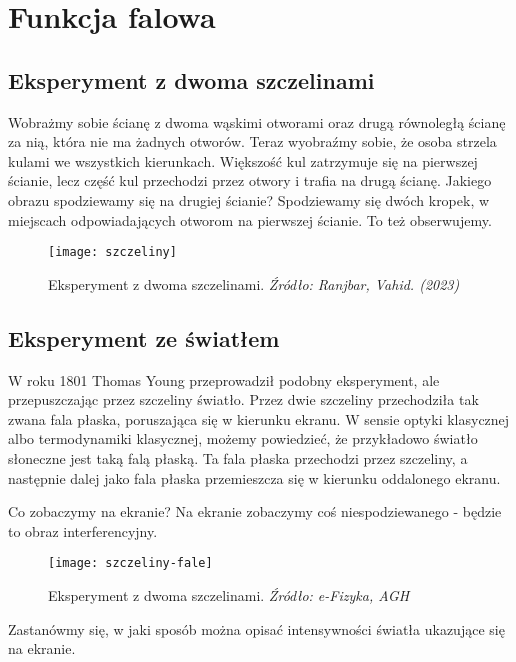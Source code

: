 \section{Funkcja falowa}

\subsection{Eksperyment z dwoma szczelinami}

Wobrażmy sobie ścianę z dwoma wąskimi otworami oraz drugą równoległą ścianę za nią, która nie ma żadnych otworów.
Teraz wyobraźmy sobie, że osoba strzela kulami we wszystkich kierunkach. Większość kul zatrzymuje się na pierwszej ścianie,
lecz część kul przechodzi przez otwory i trafia na drugą ścianę.
Jakiego obrazu spodziewamy się na drugiej ścianie? Spodziewamy się dwóch kropek, w miejscach odpowiadających otworom na pierwszej ścianie. To też obserwujemy.

\begin{figure}[H]
    \centering
    \texttt{[image: szczeliny]}
    \caption{Eksperyment z dwoma szczelinami. \textit{Źródło: Ranjbar, Vahid. (2023)}}
    \label{fig:szczeliny}
\end{figure}

\subsection{Eksperyment ze światłem}
W roku 1801 Thomas Young przeprowadził podobny eksperyment, ale przepuszczając przez szczeliny światło.
Przez dwie szczeliny przechodziła tak zwana fala płaska, poruszająca się w kierunku ekranu.
W sensie optyki klasycznej albo termodynamiki klasycznej, możemy powiedzieć, że przykładowo światło słoneczne jest taką falą płaską.
Ta fala płaska przechodzi przez szczeliny, a następnie dalej jako fala płaska przemieszcza się w kierunku oddalonego ekranu.

Co zobaczymy na ekranie? Na ekranie zobaczymy coś niespodziewanego - będzie to obraz interferencyjny.
\begin{figure}[H]
    \centering
    \texttt{[image: szczeliny-fale]}
    \caption{Eksperyment z dwoma szczelinami. \textit{Źródło: e-Fizyka, AGH}}
    \label{fig:szczeliny-fale}
\end{figure}

Zastanówmy się, w jaki sposób można opisać intensywności światła ukazujące się na ekranie.

